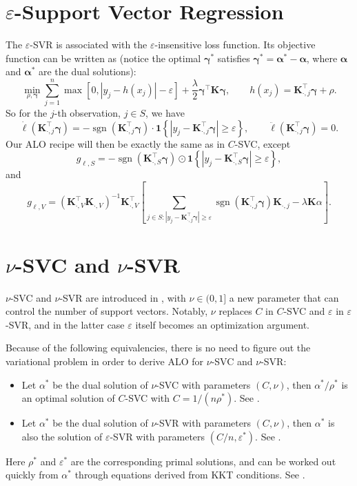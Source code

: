 \documentclass[11pt]{article}
\newcommand{\bK}{\bm{K}}
\newcommand{\balpha}{\bm{\alpha}}
\newcommand{\bgamma}{\bm{\gamma}}
\DeclareMathOperator{\sign}{sgn}
\begin{document}
\section{\(\varepsilon\)-Support Vector Regression}
The \(\varepsilon\)-SVR is associated with the \(\varepsilon\)-insensitive loss function. Its objective function can be written as (notice the optimal \(\bgamma^\ast\) satisfies \(\bgamma^\ast=\balpha^\ast-\balpha\), where \(\balpha\) and \(\balpha^\ast\) are the dual solutions):
\begin{equation}
\min_{\rho,\bgamma}\sum_{j=1}^{n}\max\left[0, |y_j-h(x_j)|-\varepsilon\right]+\frac{\lambda}{2}\bgamma^\top\bK\bgamma, \qquad h(x_j)=\bK_{\cdot,j}^\top\bgamma+\rho.
\end{equation} 
So for the \(j\)-th observation, \(j\in S\), we have \[\dot{\ell}(\bK_{\cdot,j}^\top\bgamma)=-\sign\left(\bK_{\cdot,j}^\top\bgamma\right)\cdot\bm{1}\left\{\left|y_j-\bK_{\cdot,j}^\top\bgamma\right|\geq\varepsilon\right\},\qquad\ddot{\ell}(\bK_{\cdot,j}^\top\bgamma)=0.\] Our ALO recipe will then be exactly the same as in \(C\)-SVC, except \[g_{\ell, S}=-\sign\left(\bK_{\cdot,S}^\top\bgamma\right)\odot\bm{1}\left\{\left|y_j-\bK_{\cdot,S}^\top\bgamma\right|\geq\varepsilon\right\},\] and \[g_{\ell, V}=\left(\bK_{\cdot,V}^\top\bK_{\cdot,V}\right)^{-1}\bK_{\cdot,V}^\top\left[\sum_{j\in S:\left|y_j-\bK_{\cdot,j}^\top\bgamma\right|\geq\varepsilon}\sign\left(\bK_{\cdot,j}^\top\bgamma\right)\bK_{\cdot,j}-\lambda\bK\alpha\right].\]

\section{\(\nu\)-SVC and \(\nu\)-SVR}
\(\nu\)-SVC and \(\nu\)-SVR are introduced in \autocite{S2000}, with \(\nu\in(0, 1]\) a new parameter that can control the number of support vectors. Notably, \(\nu\) replaces \(C\) in \(C\)-SVC and \(\varepsilon\) in \(\varepsilon\)-SVR, and in the latter case \(\varepsilon\) itself becomes an optimization argument.

Because of the following equivalencies, there is no need to figure out the variational problem in order to derive ALO for \(\nu\)-SVC and \(\nu\)-SVR:
	\begin{itemize}
	\item Let \(\alpha^\ast\) be the dual solution of \(\nu\)-SVC with parameters \((C,\nu)\), then \(\alpha^\ast/\rho^\ast\) is an optimal solution of \(C\)-SVC with \(C=1/(n\rho^\ast)\). See \autocite{CL2001}.
	\item Let \(\alpha^\ast\) be the dual solution of \(\nu\)-SVR with parameters \((C,\nu)\), then \(\alpha^\ast\) is also the solution of \(\varepsilon\)-SVR with parameters \((C/n,\varepsilon^\ast)\). See \autocite{CL2002}.
	\end{itemize}
Here \(\rho^\ast\) and \(\varepsilon^\ast\) are the corresponding primal solutions, and can be worked out quickly from \(\alpha^\ast\) through equations derived from KKT conditions. See \cite[Section~4.2]{CL2011}.
\end{document}
